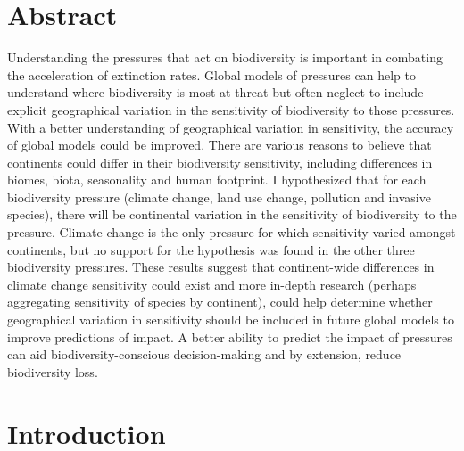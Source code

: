 \documentclass[11pt, a4paper, titlepage]{article}
\begin{document}
	\newpage
	
	\section*{Abstract}
	 Understanding the pressures that act on biodiversity is important in combating the acceleration of extinction rates. Global models of pressures can help to understand where biodiversity is most at threat but often neglect to include explicit geographical variation in the sensitivity of biodiversity to those pressures. With a better understanding of geographical variation in sensitivity, the accuracy of global models could be improved. There are various reasons to believe that continents could differ in their biodiversity sensitivity, including differences in biomes, biota, seasonality and human footprint. I hypothesized that for each biodiversity pressure (climate change, land use change, pollution and invasive species), there will be continental variation in the sensitivity of biodiversity to the pressure. Climate change is the only pressure for which sensitivity varied amongst continents, but no support for the hypothesis was found in the other three biodiversity pressures. These results suggest that continent-wide differences in climate change sensitivity could exist and more in-depth research (perhaps aggregating sensitivity of species by continent), could help determine whether geographical variation in sensitivity should be included in future global models to improve predictions of impact. A better ability to predict the impact of pressures can aid biodiversity-conscious decision-making and by extension, reduce biodiversity loss. 
	
\newpage
\tableofcontents
\newpage
	
    \section*{Introduction}
    	
\end{document}
